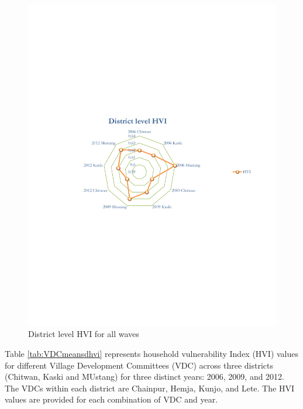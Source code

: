 \begin{figure}[htb]
\vspace{-250pt} %
	\includegraphics[scale=0.8]{./figure/HVI_Summary_District_Panel.pdf}
	\vspace{-20pt}
	\caption{District level HVI for all waves} 
	\label{fig:distictlevelhvi}
\end{figure}

Table \ref{tab:VDCmeansdhvi} represents household vulnerability Index (HVI) values for different Village Development Committees (VDC) across three districts (Chitwan, Kaski and MUstang) for three distinct years: 2006, 2009, and 2012. The VDCs within each district are Chainpur, Hemja, Kunjo, and Lete. The HVI values are provided for each combination of VDC and year.

